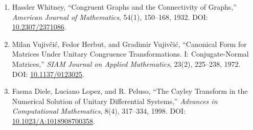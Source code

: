 \documentclass[
  10pt,
  a4paper,
]{article}
\providecommand{\tightlist}{%
  \setlength{\itemsep}{0pt}\setlength{\parskip}{0pt}}
\begin{document}
\begin{enumerate}
\def\labelenumi{\arabic{enumi}.}
\setcounter{enumi}{2}
\tightlist
\item
  Hassler Whitney, ``Congruent Graphs and the Connectivity of Graphs,''
  \emph{American Journal of Mathematics}, 54(1), 150--168, 1932. DOI:
  \href{https://doi.org/10.2307/2371086}{10.2307/2371086}.
\item
  Milan Vujivčić, Fedor Herbut, and Gradimir Vujivčić, ``Canonical Form
  for Matrices Under Unitary Congruence Transformations. I:
  Conjugate-Normal Matrices,'' \emph{SIAM Journal on Applied
  Mathematics}, 23(2), 225--238, 1972. DOI:
  \href{https://doi.org/10.1137/0123025}{10.1137/0123025}.
\item
  Fasma Diele, Luciano Lopez, and R. Peluso, ``The Cayley Transform in
  the Numerical Solution of Unitary Differential Systems,''
  \emph{Advances in Computational Mathematics}, 8(4), 317--334, 1998.
  DOI:
  \href{https://doi.org/10.1023/A:1018908700358}{10.1023/A:1018908700358}.
\end{enumerate}
\end{document}
